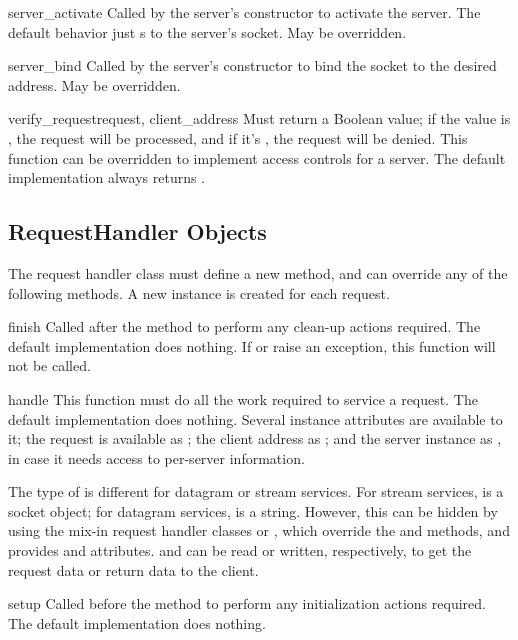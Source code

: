 
\begin{funcdesc}{server_activate}{}
Called by the server's constructor to activate the server.  The default
behavior just s to the server's socket.
May be overridden.
\end{funcdesc}

\begin{funcdesc}{server_bind}{}
Called by the server's constructor to bind the socket to the desired
address.  May be overridden.
\end{funcdesc}

\begin{funcdesc}{verify_request}{request, client_address}
Must return a Boolean value; if the value is , the request will be
processed, and if it's , the request will be denied.
This function can be overridden to implement access controls for a server.
The default implementation always returns .
\end{funcdesc}

\subsection{RequestHandler Objects}

The request handler class must define a new  method,
and can override any of the following methods.  A new instance is
created for each request.

\begin{funcdesc}{finish}{}
Called after the  method to perform any clean-up
actions required.  The default implementation does nothing.  If
 or  raise an exception, this
function will not be called.
\end{funcdesc}

\begin{funcdesc}{handle}{}
This function must do all the work required to service a request.
The default implementation does nothing.
Several instance attributes are available to it; the request is
available as ; the client address as
; and the server instance as
, in case it needs access to per-server
information.

The type of  is different for datagram or stream
services.  For stream services,  is a socket
object; for datagram services,  is a string.
However, this can be hidden by using the mix-in request handler
classes
 or , which
override the  and  methods, and
provides  and  attributes.
 and  can be read or written,
respectively, to get the request data or return data to the client.
\end{funcdesc}

\begin{funcdesc}{setup}{}
Called before the  method to perform any
initialization actions required.  The default implementation does
nothing.
\end{funcdesc}
